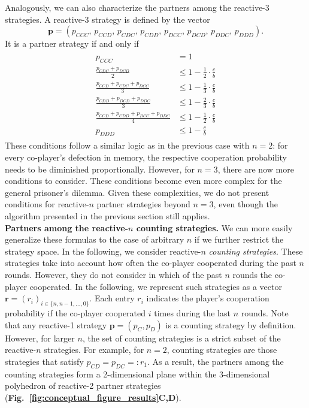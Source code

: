 \documentclass[11pt]{article}
\newcommand{\figref}[1]{{\textbf{Fig.~\ref{#1}}}}
\begin{document}
Analogously, we can also characterize the partners among the reactive-3 strategies. 
A reactive-3 strategy is defined by the vector 
\begin{equation}
\mathbf{p} = (p_{CCC},\, p_{CCD},\, p_{CDC},\, p_{CDD},\, p_{DCC},\, p_{DCD},\, p_{DDC},\, p_{DDD}).
\end{equation}
It is a partner strategy if and only if
\begin{align}\label{eq:three_bit_conditions}
  \begin{split}
  p_{CCC} & = 1 \\[0.2cm]
  \frac{p_{CDC} + p_{DCD}}{2} & \leq 1 - \frac{1}{2} \cdot \frac{c}{b} \\[0.2cm]
  \frac{p_{CCD} + p_{CDC} + p_{DCC}}{3} & \leq 1 - \frac{1}{3} \cdot \frac{c}{b} \\[0.2cm]
  \frac{p_{CDD} + p_{DCD} + p_{DDC}}{3} & \leq 1 - \frac{2}{3} \cdot \frac{c}{b} \\[0.2cm]
  \frac{p_{CCD} + p_{CDD} + p_{DCC} + p_{DDC}}{4}  & \leq 1 - \frac{1}{2} \cdot \frac{c}{b}  \\[0.2cm]
  p_{DDD} & \leq 1\!-\! \frac{c}{b}
  \end{split}
\end{align}
These conditions follow a similar logic as in the previous case with $n\!=\!2$: 
for every co-player's defection in memory, the respective cooperation probability needs to be diminished proportionally. 
However, for $n\!=\!3$, there are now more conditions to consider. 
These conditions become even more complex for the general prisoner's dilemma. 
Given these complexities, we do not present conditions for reactive-$n$ partner strategies beyond $n\!=\!3$, even though the algorithm presented in the previous section still applies.\\


\noindent
\textbf{Partners among the reactive-$n$ counting strategies.}
We can more easily generalize these formulas to the case of arbitrary $n$ if we further restrict the strategy space. 
In the following, we consider reactive-$n$ {\it counting strategies}. 
These strategies take into account how often the co-player cooperated during the past $n$ rounds. 
However, they do not consider in which of the past $n$ rounds the co-player cooperated. 
In the following, we represent such strategies as a vector $\mathbf{r}\!=\!(r_i)_{i \in \{n, n -1, \dots, 0\}}$. 
Each entry \(r_i\) indicates the player's cooperation probability if the co-player cooperated \(i\) times during the last \(n\) rounds. 
Note that any reactive-1 strategy $\mathbf{p}\!=\!(p_{C}, p_{D})$ is a counting strategy by definition. 
However, for larger $n$, the set of counting strategies is a strict subset of the reactive-$n$ strategies.
For example, for $n\!=\!2$, counting strategies are those strategies that satisfy $p_{CD}\!=\!p_{DC}\!=:\!r_1$. 
As a result, the partners among the counting strategies form a 2-dimensional plane within the 3-dimensional polyhedron of reactive-2 partner strategies (\figref{fig:conceptual_figure_results}\textbf{C,D}).
\end{document}

